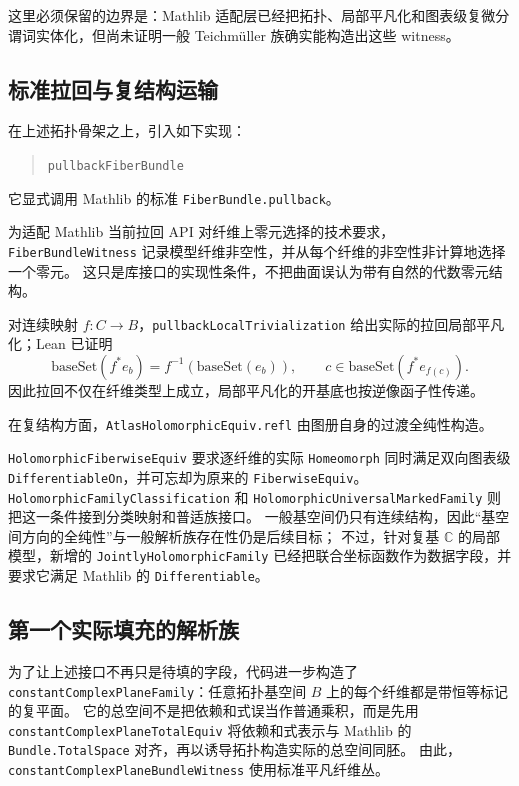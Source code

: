 \documentclass[UTF8,fontset=none,a4paper,11pt]{ctexart}
\begin{document}
这里必须保留的边界是：Mathlib 适配层已经把拓扑、局部平凡化和图表级复微分谓词实体化，但尚未证明一般 Teichmüller 族确实能构造出这些 witness。

\subsection{标准拉回与复结构运输}

在上述拓扑骨架之上，引入如下实现：
\begin{quote}
\texttt{pullbackFiberBundle}
\end{quote}
它显式调用 Mathlib 的标准 \texttt{FiberBundle.pullback}。

为适配 Mathlib 当前拉回 API 对纤维上零元选择的技术要求，
\texttt{FiberBundleWitness} 记录模型纤维非空性，并从每个纤维的非空性非计算地选择一个零元。
这只是库接口的实现性条件，不把曲面误认为带有自然的代数零元结构。

对连续映射 $f:C\to B$，\texttt{pullbackLocalTrivialization} 给出实际的拉回局部平凡化；Lean 已证明
\[
  \mathrm{baseSet}(f^*e_b)=f^{-1}(\mathrm{baseSet}(e_b)),
  \qquad
  c\in\mathrm{baseSet}(f^*e_{f(c)}).
\]
因此拉回不仅在纤维类型上成立，局部平凡化的开基底也按逆像函子性传递。

在复结构方面，\texttt{AtlasHolomorphicEquiv.refl} 由图册自身的过渡全纯性构造。

\texttt{HolomorphicFiberwiseEquiv} 要求逐纤维的实际 \texttt{Homeomorph} 同时满足双向图表级
\texttt{DifferentiableOn}，并可忘却为原来的 \texttt{FiberwiseEquiv}。
\texttt{HolomorphicFamilyClassification} 和
\texttt{HolomorphicUniversalMarkedFamily} 则把这一条件接到分类映射和普适族接口。
一般基空间仍只有连续结构，因此“基空间方向的全纯性”与一般解析族存在性仍是后续目标；
不过，针对复基 $\mathbb C$ 的局部模型，新增的
\texttt{JointlyHolomorphicFamily} 已经把联合坐标函数作为数据字段，并要求它满足 Mathlib 的
\texttt{Differentiable}。

\clearpage
\subsection{第一个实际填充的解析族}

为了让上述接口不再只是待填的字段，代码进一步构造了
\texttt{constantComplexPlaneFamily}：任意拓扑基空间 $B$ 上的每个纤维都是带恒等标记的复平面。
它的总空间不是把依赖和式误当作普通乘积，而是先用
\texttt{constantComplexPlaneTotalEquiv} 将依赖和式表示与 Mathlib 的
\texttt{Bundle.TotalSpace} 对齐，再以诱导拓扑构造实际的总空间同胚。
由此，\texttt{constantComplexPlaneBundleWitness} 使用标准平凡纤维丛。
\end{document}
